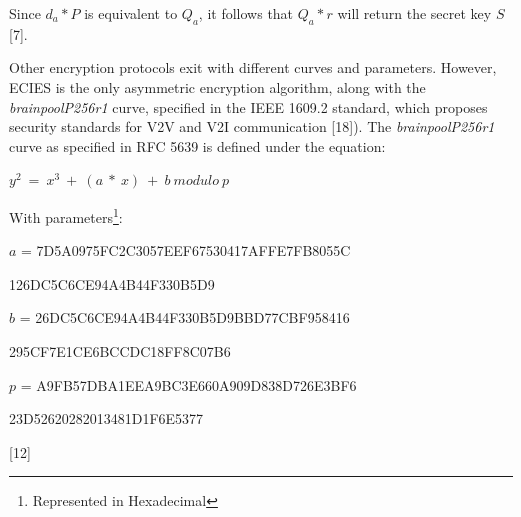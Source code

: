 \documentclass[conference,compsoc]{IEEEtran}
\begin{document}
Since $d_a * P$ is equivalent to $Q_a$, it follows that $Q_a * r$ will return the secret key $S$ [7].

Other encryption protocols exit with different curves and parameters. However, ECIES is the only asymmetric encryption algorithm, along with the \emph{brainpoolP256r1} curve, specified in the IEEE 1609.2 standard, which proposes security standards for V2V and V2I communication [18]). The \emph{brainpoolP256r1} curve as specified in RFC 5639 is defined under the equation:\\

\begin{center}
\large $y^2~ =~ x^3~ +~ (a~*~x)~ +~ b~ modulo~ p$
\newpage
\end{center}
With parameters\footnote{Represented in Hexadecimal}:\\
\begin{center}
$a$ = 7D5A0975FC2C3057EEF67530417AFFE7FB8055C\end{center}

126DC5C6CE94A4B44F330B5D9
\begin{center}
$b$ = 26DC5C6CE94A4B44F330B5D9BBD77CBF958416\end{center}

295CF7E1CE6BCCDC18FF8C07B6
\begin{center}
$p$ = A9FB57DBA1EEA9BC3E660A909D838D726E3BF6\end{center}

23D52620282013481D1F6E5377

\hfill{[12]}\\
\end{document}
